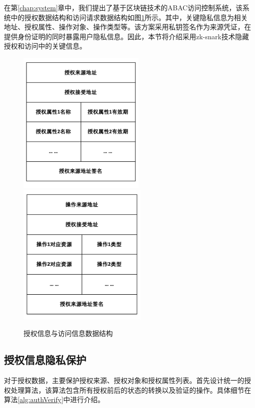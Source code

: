 在第\ref{chap:system}章中，我们提出了基于区块链技术的ABAC访问控制系统，该系统中的授权数据结构和访问请求数据结构如图\ref{fig:data-structure}所示。其中，关键隐私信息为相关地址、授权属性、操作对象、操作类型等。该方案采用私钥签名作为来源凭证，在提供身份证明的同时暴露用户隐私信息。因此，本节将介绍采用zk-snark技术隐藏授权和访问中的关键信息。

\begin{figure}[ht]
  \centering%
    {\includegraphics[height=7cm]{figures/auth-data.png}}%
  \hspace{4em}%
      {\includegraphics[height=7cm]{figures/op-data.png}}
  \caption{授权信息与访问信息数据结构}
  \label{fig:data-structure}
\end{figure}

\subsection{授权信息隐私保护}

对于授权数据，主要保护授权来源、授权对象和授权属性列表。首先设计统一的授权处理算法，该算法包含所有授权前后的状态的转换以及验证的操作。具体细节在算法\ref{alg:authVerify}中进行介绍。

